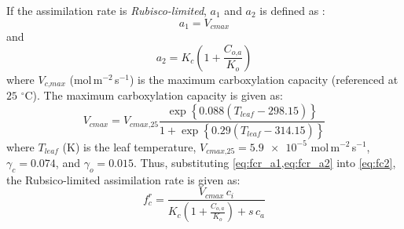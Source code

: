 If the assimilation rate is \textit{Rubisco-limited}, $a_1$ and $a_2$ is defined as \citep{Manoli2014,Katul2010}:
\begin{equation}
a_1 = V_{\textit{cmax}}
\label{eq:fcr_a1}
\end{equation} 
and
\begin{equation}
a_2 = K_c \left(1 + \frac{C_{\textit{o,a}}}{K_o}\right)
\label{eq:fcr_a2}
\end{equation} 
where $V_{\textit{c,max}}$ (mol\,m$^{-2}$\,s$^{-1}$) is the maximum carboxylation capacity (referenced at $25$ $^{\circ}$C). The maximum carboxylation capacity is given as:
\begin{equation}
V_{\textit{cmax}} = V_{\textit{cmax,25}} \frac{ \exp\left\{ 0.088 \left(T_{\textit{leaf}} - 298.15\right)\right\} }{1 + \exp\left\{0.29\left(T_{\textit{leaf}} - 314.15\right)\right\} }
\end{equation}
where $T_{\textit{leaf}}$ (K) is the leaf temperature, $V_{\textit{cmax,25}} = \num{5.9e-5}$ mol\,m$^{-2}$\,s$^{-1}$,
$\gamma_c = 0.074$, and $\gamma_o = 0.015$. Thus, substituting \cref{eq:fcr_a1,eq:fcr_a2} into \cref{eq:fc2}, the Rubsico-limited assimilation rate is given as:
\begin{equation}
f_c^r = \frac{V_{\textit{cmax}}\,c_i}{K_c \left(1 + \frac{C_{o,a}}{K_o}\right) + s\,c_a}
\end{equation}

